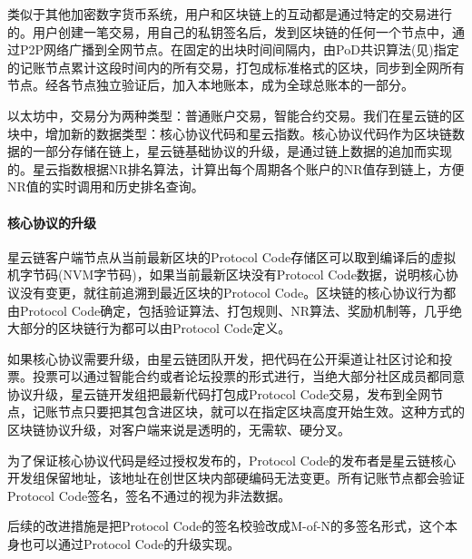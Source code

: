类似于其他加密数字货币系统，用户和区块链上的互动都是通过特定的交易进行的。用户创建一笔交易，用自己的私钥签名后，发到区块链的任何一个节点中，通过P2P网络广播到全网节点。在固定的出块时间间隔内，由PoD共识算法(见)指定的记账节点累计这段时间内的所有交易，打包成标准格式的区块，同步到全网所有节点。经各节点独立验证后，加入本地账本，成为全球总账本的一部分。

以太坊中，交易分为两种类型：普通账户交易，智能合约交易。我们在星云链的区块中，增加新的数据类型：核心协议代码和星云指数。核心协议代码作为区块链数据的一部分存储在链上，星云链基础协议的升级，是通过链上数据的追加而实现的。星云指数根据NR排名算法，计算出每个周期各个账户的NR值存到链上，方便NR值的实时调用和历史排名查询。

\paragraph{核心协议的升级}

星云链客户端节点从当前最新区块的Protocol Code存储区可以取到编译后的虚拟机字节码(NVM字节码)，如果当前最新区块没有Protocol Code数据，说明核心协议没有变更，就往前追溯到最近区块的Protocol Code。区块链的核心协议行为都由Protocol Code确定，包括验证算法、打包规则、NR算法、奖励机制等，几乎绝大部分的区块链行为都可以由Protocol Code定义。

如果核心协议需要升级，由星云链团队开发，把代码在公开渠道让社区讨论和投票。投票可以通过智能合约或者论坛投票的形式进行，当绝大部分社区成员都同意协议升级，星云链开发组把最新代码打包成Protocol Code交易，发布到全网节点，记账节点只要把其包含进区块，就可以在指定区块高度开始生效。这种方式的区块链协议升级，对客户端来说是透明的，无需软、硬分叉。

为了保证核心协议代码是经过授权发布的，Protocol Code的发布者是星云链核心开发组保留地址，该地址在创世区块内部硬编码无法变更。所有记账节点都会验证Protocol Code签名，签名不通过的视为非法数据。

后续的改进措施是把Protocol Code的签名校验改成M-of-N的多签名形式，这个本身也可以通过Protocol Code的升级实现。
